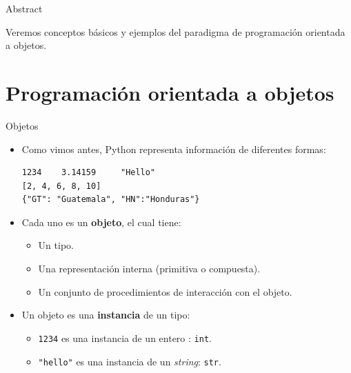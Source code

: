 \documentclass[mathserif]{beamer}
\subtitle{%
  \bfseries{Programación orientada a objetos}\\%
}
\begin{document}


\begin{frame}{Abstract}
    
	\begin{blurb}
		Veremos conceptos básicos y ejemplos del paradigma de programación orientada a objetos.
	\end{blurb}
\end{frame}


\section{Programación orientada a objetos}

\begin{frame}[fragile]{Objetos}
    \begin{itemize}
        \item Como vimos antes, Python representa información de diferentes formas:
\begin{lstlisting}
1234    3.14159     "Hello"
[2, 4, 6, 8, 10]
{"GT": "Guatemala", "HN":"Honduras"}
\end{lstlisting}
        
        \item Cada uno es un {\blue\bfseries objeto}, el cual tiene:
        \begin{itemize}
            \item Un {\orange tipo}.
            \item Una {\orange representación interna} (primitiva o compuesta).
            \item Un conjunto de procedimientos de {\orange interacción} con el objeto.
        \end{itemize}
        
        \item Un objeto es una {\blue\bfseries instancia} de un tipo:
        \begin{itemize}
            \item \lstinline|1234| es una instancia de un entero :  \lstinline|int|.
            \item \lstinline|"hello"| es una instancia de un \textit{string}: \lstinline|str|.
        \end{itemize}
    \end{itemize}
\end{frame}
\end{document}
